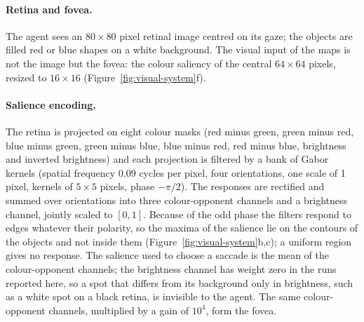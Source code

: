 \documentclass[14pt]{article}
\begin{document}
\paragraph{Retina and fovea.}
The agent sees an $80\times80$ pixel retinal image centred on its gaze; the objects are filled red or blue shapes on a white background.
The visual input of the maps is not the image but the fovea: the colour saliency of the central $64\times64$ pixels, resized to $16\times16$ (Figure~\ref{fig:visual-system}f).

\paragraph{Salience encoding.}
The retina is projected on eight colour masks (red minus green, green minus red, blue minus green, green minus blue, blue minus red, red minus blue, brightness and inverted brightness) and each projection is filtered by a bank of Gabor kernels (spatial frequency 0.09 cycles per pixel, four orientations, one scale of 1 pixel, kernels of $5\times5$ pixels, phase $-\pi/2$).
The responses are rectified and summed over orientations into three colour-opponent channels and a brightness channel, jointly scaled to $[0,1]$.
Because of the odd phase the filters respond to edges whatever their polarity, so the maxima of the salience lie on the contours of the objects and not inside them (Figure~\ref{fig:visual-system}b,c); a uniform region gives no response.
The salience used to choose a saccade is the mean of the colour-opponent channels; the brightness channel has weight zero in the runs reported here, so a spot that differs from its background only in brightness, such as a white spot on a black retina, is invisible to the agent.
The same colour-opponent channels, multiplied by a gain of $10^4$, form the fovea.
\end{document}
